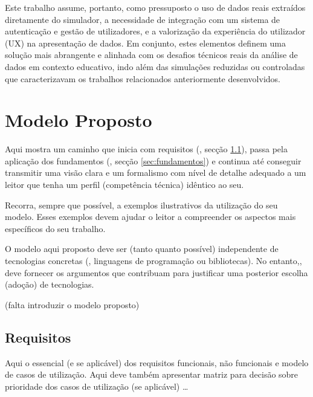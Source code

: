 Este trabalho assume, portanto, como pressuposto o uso de dados reais extraídos diretamente do simulador, a necessidade de integração com um sistema de autenticação e gestão de utilizadores, e a valorização da experiência do utilizador (UX) na apresentação de dados. Em conjunto, estes elementos definem uma solução mais abrangente e alinhada com os desafios técnicos reais da análise de dados em contexto educativo, indo além das simulações reduzidas ou controladas que caracterizavam os trabalhos relacionados anteriormente desenvolvidos.


\chapter{Modelo Proposto}
\label{ch:modeloProposto}

Aqui mostra um caminho que inicia com requisitos (\cf, secção \ref{sec:requisitos}), passa pela aplicação dos fundamentos (\cf, secção \ref{sec:fundamentos}) e continua até conseguir transmitir uma visão clara e um formalismo com nível de detalhe adequado a um leitor que tenha um perfil (competência técnica) idêntico ao seu.

Recorra, sempre que possível, a exemplos ilustrativos da utilização do seu modelo. Esses exemplos devem ajudar o leitor a compreender os aspectos mais específicos do seu trabalho.

O modelo aqui proposto deve ser (tanto quanto possível) independente de tecnologias concretas (\eg, linguagens de programação ou bibliotecas). No entanto,, deve fornecer os argumentos que contribuam para justificar uma posterior escolha (adoção) de tecnologias.


(falta introduzir o modelo proposto)


\section{Requisitos}
\label{sec:requisitos}

Aqui o essencial (e se aplicável) dos requisitos funcionais, não funcionais e modelo de casos de utilização. Aqui deve também apresentar matriz para decisão sobre prioridade dos casos de utilização (se aplicável) \ldots

